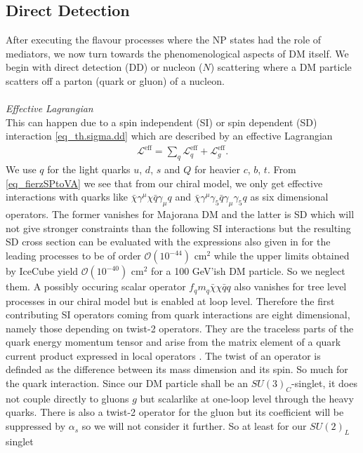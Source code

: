 \subsection{Direct Detection}
After executing the flavour processes where the NP states had the role of mediators, we now turn towards the phenomenological aspects of DM itself.
We begin with direct detection (DD) or nucleon ($N$) scattering where a DM particle scatters off a parton (quark or gluon) of a nucleon. 
\\ \\ \textit{Effective Lagrangian}\\
This can happen
due to a spin independent (SI) or spin dependent (SD) interaction \eqref{eq_th.sigma.dd} which are described by an effective Lagrangian \cite{1104.0228}
\begin{align}
 \mathcal{L}^\text{eff} = \sum\limits_{q} \mathcal{L}^\text{eff}_q + \mathcal{L}^\text{eff}_g.
\end{align}
We use $q$ for the light quarks $u$, $d$, $s$ and $Q$ for heavier $c$, $b$, $t$. From \eqref{eq_fierzSPtoVA} we see that from our chiral model, 
we only get effective interactions with quarks like $\bar \chi\gamma^\mu\chi \bar q\gamma_\mu q$ and $\bar \chi\gamma^\mu\gamma_5 \bar q\gamma_\mu \gamma_5 q$
as six dimensional operators. The former vanishes for Majorana DM and the latter is SD which will not give stronger constraints than the following SI
interactions but the resulting SD cross section can be evaluated with the expressions also given in \cite{1104.0228} for the leading processes to be of
order $\mathcal{O}(10^{-44})$ cm$^2$ while the upper limits obtained by IceCube \cite{1212.4097} yield $\mathcal{O}(10^{-40})$ cm$^2$ for 
a 100 GeV'ish DM particle.
So we neglect them. A possibly occuring scalar operator $f_q m_q\bar \chi \chi \bar q q$ also vanishes for tree level processes in our chiral model
but is enabled at loop level. Therefore the first contributing
SI operators coming from quark interactions are eight dimensional, namely those depending on twist-2 operators. They are the traceless parts of the
quark energy momentum tensor and arise from the matrix element of a quark current product expressed in local operators \cite{MDSchwartz}. The twist of 
an operator is definded as the difference between its mass dimension and its spin. So much for the quark interaction. Since our DM particle shall be an 
$SU(3)_C$-singlet, it does not couple directly to gluons $g$ but scalarlike at one-loop level through the heavy quarks. There is also a twist-2 
operator for the gluon but its coefficient will be suppressed by $\alpha_s$ so we will not consider it further. So at least for our $SU(2)_L$ singlet
